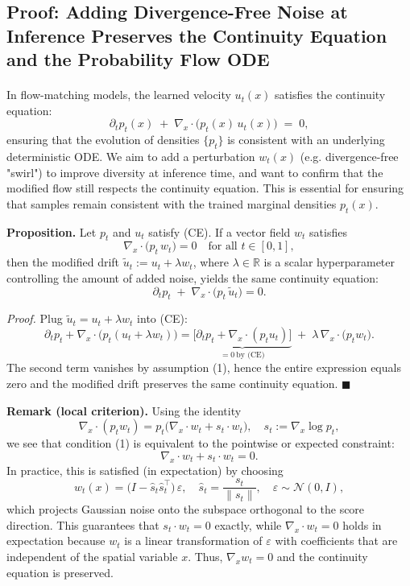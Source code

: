 \documentclass{article}
\begin{document}
\subsection{Proof: Adding Divergence-Free Noise at Inference Preserves the Continuity Equation and the Probability Flow ODE}

\paragraph{}  
In flow-matching models, the learned velocity \(u_t(x)\) satisfies the continuity equation:
\[
\partial_t p_t(x)\;+\;\nabla_x\!\cdot\!\bigl(p_t(x)\,u_t(x)\bigr)\;=\;0,
\tag{CE}
\]
ensuring that the evolution of densities \(\{p_t\}\) is consistent with an underlying deterministic ODE.  
We aim to add a perturbation \(w_t(x)\) (e.g. divergence-free "swirl") to improve diversity at inference time, and want to confirm that the modified flow still respects the continuity equation. This is essential for ensuring that samples remain consistent with the trained marginal densities \(p_t(x)\).

\bigskip
\noindent\textbf{Proposition.}  
Let \(p_t\) and \(u_t\) satisfy \textup{(CE)}.  
If a vector field \(w_t\) satisfies
\[
\nabla_x\!\cdot\!\bigl(p_t\,w_t\bigr)=0
\quad\text{for all }t\in[0,1],
\tag{1}
\]
then the modified drift
\(
\tilde u_t := u_t + \lambda w_t
\),
where \(\lambda \in \mathbb{R}\) is a scalar hyperparameter controlling the amount of added noise,
yields the same continuity equation:
\[
\partial_t p_t\;+\;\nabla_x\!\cdot\!\bigl(p_t\,\tilde u_t\bigr)=0.
\]

\smallskip
\noindent\emph{Proof.}  
Plug \(\tilde u_t = u_t + \lambda w_t\) into \textup{(CE)}:
\[
\partial_t p_t + \nabla_x\!\cdot\!\bigl(p_t(u_t+\lambda w_t)\bigr)
   = \underbrace{\bigl[\partial_t p_t + \nabla_x\!\cdot(p_t u_t)\bigr]}_{=0\ \text{by (CE)}}
     \;+\;\lambda\,\nabla_x\!\cdot\!\bigl(p_t w_t\bigr).
\]
The second term vanishes by assumption \textup{(1)}, hence the entire expression equals zero and the modified drift preserves the same continuity equation.
\hfill$\blacksquare$

\bigskip
\noindent\textbf{Remark (local criterion).}
Using the identity
\[
\nabla_x\!\cdot(p_t w_t)=p_t\bigl(\nabla_x\!\cdot w_t + s_t\!\cdot w_t\bigr),
\quad s_t := \nabla_x\!\log p_t,
\]
we see that condition \textup{(1)} is equivalent to the pointwise or expected constraint:
\[
\boxed{\nabla_x\!\cdot w_t + s_t\!\cdot w_t = 0.}
\]
In practice, this is satisfied (in expectation) by choosing
\[
w_t(x) = \bigl(I - \hat s_t \hat s_t^\top\bigr)\,\varepsilon,
\quad \hat s_t = \frac{s_t}{\|s_t\|},
\quad \varepsilon \sim \mathcal{N}(0,I),
\]
which projects Gaussian noise onto the subspace orthogonal to the score direction. This guarantees that \(s_t \cdot w_t = 0\) exactly, while \(\nabla_x \cdot w_t = 0\) holds in expectation because \(w_t\) is a linear transformation of \(\varepsilon\) with coefficients that are independent of the spatial variable \(x\). Thus, \(\nabla_x w_t = 0\) and the continuity equation is preserved.
\end{document}
